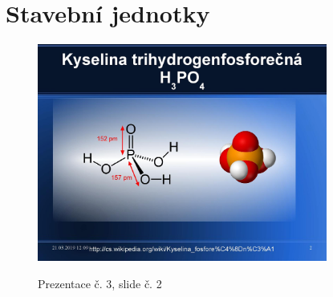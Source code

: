 \documentclass[DIV=8]{scrreprt}
\begin{document}
\section{Stavební jednotky} \label{Stavební jednotky} \FloatBarrier


\begin{figure}
    \caption{Prezentace č. 3, slide č. 2}
    \includegraphics[width=0.85\textwidth]{slides-3/slide-2.jpg}
    \centering
    \label{slides-3-slide-2}
\end{figure}
\end{document}
